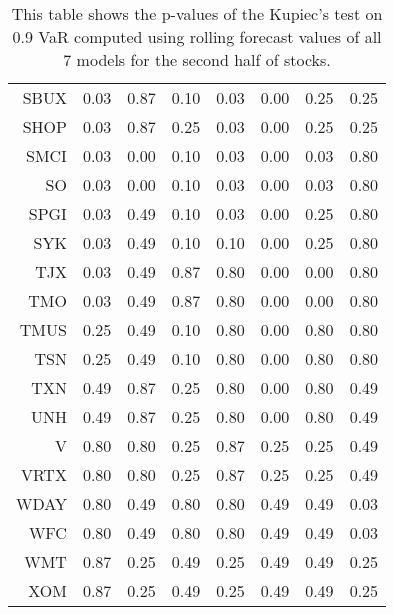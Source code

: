 \begin{table}[ht]
\begin{tabular}{rrrrrrrr}
  SBUX & 0.03 & 0.87 & 0.10 & 0.03 & 0.00 & 0.25 & 0.25 \\ 
  SHOP & 0.03 & 0.87 & 0.25 & 0.03 & 0.00 & 0.25 & 0.25 \\ 
  SMCI & 0.03 & 0.00 & 0.10 & 0.03 & 0.00 & 0.03 & 0.80 \\ 
  SO & 0.03 & 0.00 & 0.10 & 0.03 & 0.00 & 0.03 & 0.80 \\ 
  SPGI & 0.03 & 0.49 & 0.10 & 0.03 & 0.00 & 0.25 & 0.80 \\ 
  SYK & 0.03 & 0.49 & 0.10 & 0.10 & 0.00 & 0.25 & 0.80 \\ 
  TJX & 0.03 & 0.49 & 0.87 & 0.80 & 0.00 & 0.00 & 0.80 \\ 
  TMO & 0.03 & 0.49 & 0.87 & 0.80 & 0.00 & 0.00 & 0.80 \\ 
  TMUS & 0.25 & 0.49 & 0.10 & 0.80 & 0.00 & 0.80 & 0.80 \\ 
  TSN & 0.25 & 0.49 & 0.10 & 0.80 & 0.00 & 0.80 & 0.80 \\ 
  TXN & 0.49 & 0.87 & 0.25 & 0.80 & 0.00 & 0.80 & 0.49 \\ 
  UNH & 0.49 & 0.87 & 0.25 & 0.80 & 0.00 & 0.80 & 0.49 \\ 
  V & 0.80 & 0.80 & 0.25 & 0.87 & 0.25 & 0.25 & 0.49 \\ 
  VRTX & 0.80 & 0.80 & 0.25 & 0.87 & 0.25 & 0.25 & 0.49 \\ 
  WDAY & 0.80 & 0.49 & 0.80 & 0.80 & 0.49 & 0.49 & 0.03 \\ 
  WFC & 0.80 & 0.49 & 0.80 & 0.80 & 0.49 & 0.49 & 0.03 \\ 
  WMT & 0.87 & 0.25 & 0.49 & 0.25 & 0.49 & 0.49 & 0.25 \\ 
  XOM & 0.87 & 0.25 & 0.49 & 0.25 & 0.49 & 0.49 & 0.25 \\ 
   \hline
\end{tabular}
\caption[Kupiec's test p-values, alpha =0.9 (2)]{This table shows the p-values of the Kupiec's test on 0.9 VaR computed using rolling forecast values of all 7 models for the second half of stocks.} 
\label{Table:Kupiec_test_rolling_0.9_2}
\end{table}
